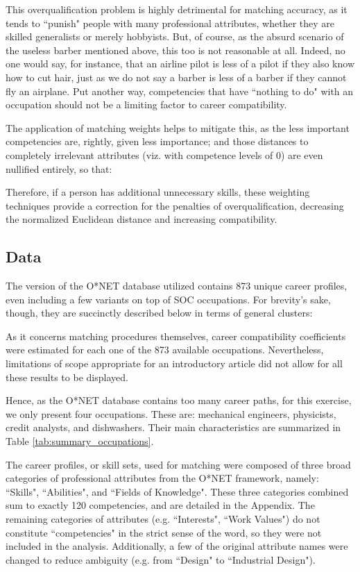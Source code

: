 \documentclass{article}
\begin{document}
This overqualification problem is highly detrimental for matching accuracy, as
it tends to ``punish" people with many professional attributes, whether they
are skilled generalists or merely hobbyists. But, of course, as the absurd
scenario of the useless barber mentioned above, this too is not reasonable at
all. Indeed, no one would say, for instance, that an airline pilot is less of a
pilot if they also know how to cut hair, just as we do not say a barber is less
of a barber if they cannot fly an airplane. Put another way, competencies that
have ``nothing to do" with an occupation should not be a limiting factor to
career compatibility.

The application of matching weights helps to mitigate this, as the less
important competencies are, rightly, given less importance; and those distances
to completely irrelevant attributes (viz. with competence levels of 0) are even
nullified entirely, so that: \EqnUnweightedWeightedDistances

Therefore, if a person has additional unnecessary skills, these weighting
techniques provide a correction for the penalties of overqualification,
decreasing the normalized Euclidean distance and increasing compatibility.

\subsection{Data}
The version of the O*NET database utilized contains 873 unique career profiles,
even including a few variants on top of SOC occupations. For brevity's sake,
though, they are succinctly described below in terms of general clusters:
\GeneralOccupationalStatistics

As it concerns matching procedures themselves, career compatibility
coefficients were estimated for each one of the 873 available occupations.
Nevertheless, limitations of scope appropriate for an introductory article did
not allow for all these results to be displayed.

Hence, as the O*NET database contains too many career paths, for this exercise,
we only present four occupations. These are: mechanical engineers, physicists,
credit analysts, and dishwashers. Their main characteristics are summarized in
Table \ref{tab:summary_occupations}. \SummaryOccupations

The career profiles, or skill sets, used for matching were composed of three
broad categories of professional attributes from the O*NET framework, namely:
``Skills", ``Abilities", and ``Fields of Knowledge". These three categories
combined sum to exactly 120 competencies, and are detailed in the Appendix. The
remaining categories of attributes (e.g. ``Interests", ``Work Values") do not
constitute ``competencies" in the strict sense of the word, so they were not
included in the analysis. Additionally, a few of the original attribute names
were changed to reduce ambiguity (e.g. from ``Design" to ``Industrial Design").
\end{document}
